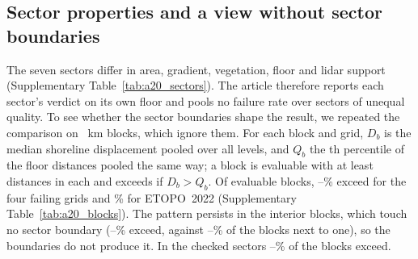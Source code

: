 \subsection*{Sector properties and a view without sector boundaries}
The seven sectors differ in area, gradient, vegetation, floor and lidar support (Supplementary Table~\ref{tab:a20_sectors}). The article therefore reports each sector's verdict on its own floor and pools no failure rate over sectors of unequal quality. To see whether the sector boundaries shape the result, we repeated the comparison on ~km blocks, which ignore them. For each block and grid, $D_b$ is the median shoreline displacement pooled over all levels, and $Q_b$ the th percentile of the floor distances pooled the same way; a block is evaluable with at least  distances in each and exceeds if $D_b > Q_b$. Of  evaluable blocks, --\% exceed for the four failing grids and \% for ETOPO~2022 (Supplementary Table~\ref{tab:a20_blocks}). The pattern persists in the  interior blocks, which touch no sector boundary (--\% exceed, against --\% of the  blocks next to one), so the boundaries do not produce it. In the checked sectors --\% of the blocks exceed.

